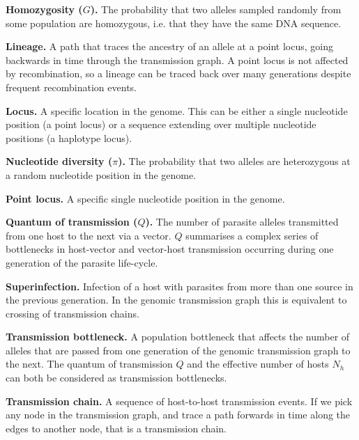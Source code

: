 \documentclass[_main.tex]{subfiles}
\begin{document}
{{\medskip

\textbf{Homozygosity ($G$).}  The probability that two alleles sampled randomly from some population are homozygous, i.e. that they have the same DNA sequence.

\medskip

\textbf{Lineage.} A path that traces the ancestry of an allele at a point locus, going backwards in time through the transmission graph.  A point locus is not affected by recombination, so a lineage can be traced back over many generations despite frequent recombination events.

\medskip

\textbf{Locus.}  A specific location in the genome.  This can be either a single nucleotide position (a point locus) or a sequence extending over multiple nucleotide positions (a haplotype locus).

\medskip

\textbf{Nucleotide diversity ($\pi$).}  The probability that two alleles are heterozygous at a random nucleotide position in the genome.

\medskip

\textbf{Point locus.}  A specific single nucleotide position in the genome. 

\medskip

\textbf{Quantum of transmission ($Q$).} The number of parasite alleles transmitted from one host to the next via a vector.  $Q$ summarises a complex series of bottlenecks in host-vector and vector-host transmission occurring during one generation of the parasite life-cycle.

\medskip

\textbf{Superinfection.}  Infection of a host with parasites from more than one source in the previous generation.  In the genomic transmission graph this is equivalent to crossing of transmission chains.

\medskip

\textbf{Transmission bottleneck.}  A population bottleneck that affects the number of alleles that are passed from one generation of the genomic transmission graph to the next.  The quantum of transmission $Q$ and the effective number of hosts $N_h$ can both be considered as transmission bottlenecks.

\medskip

\textbf{Transmission chain.}  A sequence of host-to-host transmission events.   If we pick any node in the transmission graph, and trace a path forwards in time along the edges to another node, that is a transmission chain.


    }%
}
\end{document}

